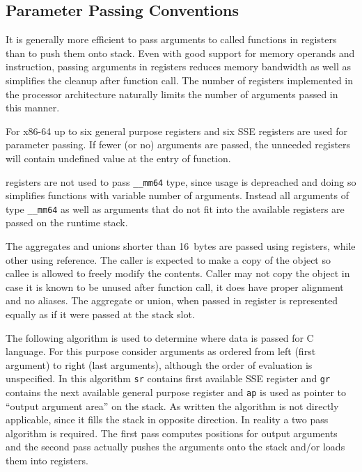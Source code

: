 \subsection{Parameter Passing Conventions}

It is generally more efficient to pass arguments to called functions in
registers than to push them onto stack. Even with good support for memory
operands and  instruction, passing arguments in registers reduces
memory bandwidth as well as simplifies the cleanup after function call.  The
number of registers implemented in the processor architecture naturally limits
the number of arguments passed in this manner.

For x86-64 up to six general purpose registers and six SSE registers are used
for parameter passing.  If fewer (or no) arguments are passed, the unneeded registers
will contain undefined value at the entry of function.

\MMX registers are not used to pass \verb|__mm64| type, since \MMX
usage is depreached and doing so simplifies functions with variable
number of arguments.  Instead all arguments of type \verb|__mm64| as
well as arguments that do not fit into the available registers are
passed on the runtime stack.

The aggregates and unions shorter than 16~bytes are passed using registers,
while other using reference.  The caller is expected to make a copy of the object
so callee is allowed to freely modify the contents.  Caller may not copy the
object in case it is known to be unused after function call, it does have
proper alignment and no aliases. The aggregate or union, when passed in register
is represented equally as if it were passed at the stack slot.

The following algorithm is used to determine where data is passed for
C language.  For this purpose consider arguments as ordered from left
(first argument) to right (last arguments), although the order of
evaluation is unspecified. In this algorithm \verb|sr| contains first
available SSE register and \verb|gr| contains the next available
general purpose register and \verb|ap| is used as pointer to ``output
argument area'' on the stack.  As written the algorithm is not
directly applicable, since it fills the stack in opposite direction.
In reality a two pass algorithm is required.  The first pass computes
positions for output arguments and the second pass actually pushes the
arguments onto the stack and/or loads them into registers.

